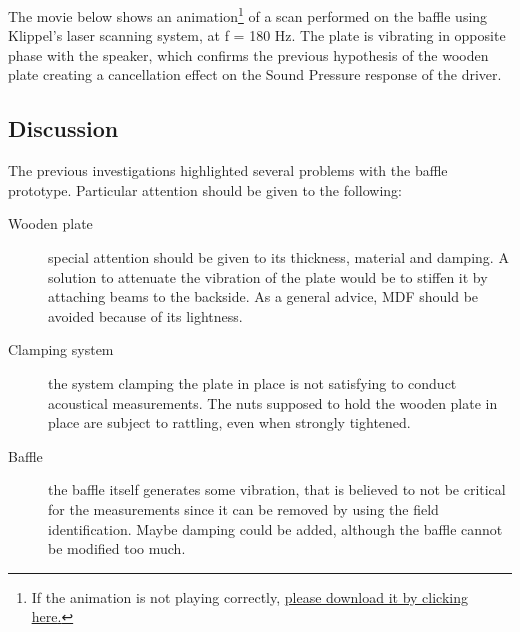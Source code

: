 \documentclass{report}
\newif\ifdraft
\begin{document}
The movie below shows an animation\footnote{If the animation is not playing correctly, \href{https://www.dropbox.com/sh/1jlodpb3biuxmhy/AADFRz8B249n8ERu3nkwyyisa?dl=0}{please download it by clicking \underline{here}.}} of a scan performed on the baffle using Klippel's laser scanning system, at f = 180 Hz. The plate is vibrating in opposite phase with the speaker,  which confirms the previous hypothesis of the wooden plate creating a cancellation effect on the Sound Pressure response of the driver. 


\ifdraft
\begin{center}
	\includemovie[draft,repeat,poster,label=baffle_vib,text={\small(Click to start...)}]{6cm}{4cm}{GridOpti/baffle_vib.avi}
\end{center}
\else
\begin{center}
\end{center}
\fi

\subsection{Discussion}

The previous investigations highlighted several problems with the baffle prototype. Particular attention should be given to the following:
\begin{description}
\item[Wooden plate] special attention should be given to its thickness, material and damping. A solution to attenuate the vibration of the plate would be to stiffen it by attaching beams to the backside. As a general advice, MDF should be avoided because of its lightness. 
\item[Clamping system] the system clamping the plate in place is not satisfying to conduct acoustical measurements. The nuts supposed to hold the wooden plate in place are subject to rattling, even when strongly tightened.
\item[Baffle] the baffle itself generates some vibration, that is believed to not be critical for the measurements since it can be removed by using the field identification. Maybe damping could be added, although the baffle cannot be modified too much. 
\end{description}


\end{document}
